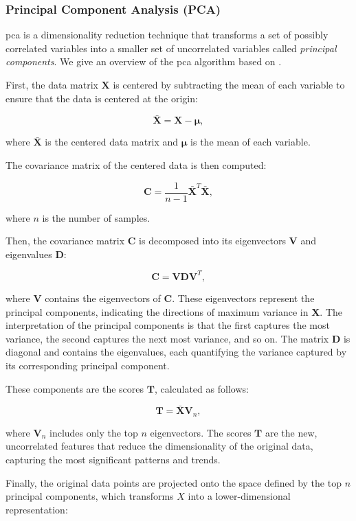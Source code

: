 \subsubsection{Principal Component Analysis (PCA)}\label{subsec:pca}
\gls{pca} is a dimensionality reduction technique that transforms a set of possibly correlated variables into a smaller set of uncorrelated variables called \textit{principal components}.
We give an overview of the \gls{pca} algorithm based on \citet{James2023AnIS}.

First, the data matrix $\mathbf{X}$ is centered by subtracting the mean of each variable to ensure that the data is centered at the origin:

$$
\mathbf{\bar{X}} = \mathbf{X} - \mathbf{\mu},
$$

where $\mathbf{\bar{X}}$ is the centered data matrix and $\mathbf{\mu}$ is the mean of each variable.

The covariance matrix of the centered data is then computed:

$$
\mathbf{C} = \frac{1}{n-1} \mathbf{\bar{X}}^T \mathbf{\bar{X}},
$$

where $n$ is the number of samples.

Then, the covariance matrix $\mathbf{C}$ is decomposed into its eigenvectors $\mathbf{V}$ and eigenvalues $\mathbf{D}$:

$$
\mathbf{C} = \mathbf{V} \mathbf{D} \mathbf{V}^T,
$$

where $\mathbf{V}$ contains the eigenvectors of $\mathbf{C}$. 
These eigenvectors represent the principal components, indicating the directions of maximum variance in $\mathbf{X}$. 
The interpretation of the principal components is that the first captures the most variance, the second captures the next most variance, and so on. 
The matrix $\mathbf{D}$ is diagonal and contains the eigenvalues, each quantifying the variance captured by its corresponding principal component.

These components are the scores $\mathbf{T}$, calculated as follows:

$$
\mathbf{T} = \mathbf{\bar{X}} \mathbf{V}_n,
$$

where $\mathbf{V}_n$ includes only the top $n$ eigenvectors.
The scores $\mathbf{T}$ are the new, uncorrelated features that reduce the dimensionality of the original data, capturing the most significant patterns and trends.

Finally, the original data points are projected onto the space defined by the top $n$ principal components, which transforms $X$ into a lower-dimensional representation:

